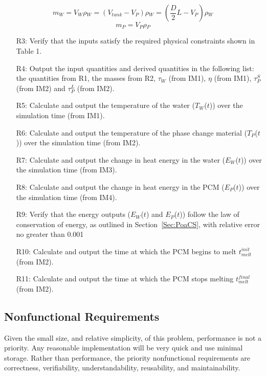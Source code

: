 \documentclass[12pt]{article}
\begin{document}
\begin{equation}
m_{W}=V_{W}\rho{}_{W}=(V_{tank}-V_{P})\rho{}_{W}=(\frac{D}{2}L-V_{P})\rho{}_{W}
\end{equation}
\begin{equation}
m_{P}=V_{P}\rho{}_{P}
\end{equation}
\begin{itemize}
\item[R3:]Verify that the inputs satisfy the required physical constraints shown in Table 1.
\item[R4:]Output the input quantities and derived quantities in the following list: the quantities from R1, the masses from R2, $\tau{}_{W}$ (from IM1), $\eta{}$ (from IM1), $\tau{}_{P}^{S}$ (from IM2) and $\tau{}_{P}^{L}$ (from IM2).
\item[R5:]Calculate and output the temperature of the water ($T_{W}$($t$)) over the simulation time (from IM1).
\item[R6:]Calculate and output the temperature of the phase change material ($T_{P}$($t$)) over the simulation time (from IM2).
\item[R7:]Calculate and  output the change in heat energy in the water ($E_{W}$($t$)) over the simulation time (from IM3).
\item[R8:]Calculate and output the change in heat energy in the PCM ($E_{P}$($t$)) over the simulation time (from IM4).
\item[R9:]Verify that the energy outputs ($E_{W}$($t$) and $E_{P}$($t$)) follow the law of conservation of energy, as outlined in Section~\ref{Sec:PoaCS}, with relative error no greater than 0.001%
\item[R10:]Calculate and output the time at which the PCM begins to melt $t_{melt}^{init}$ (from IM2).
\item[R11:]Calculate and output the time at which the PCM stops melting $t_{melt}^{final}$ (from IM2).
\end{itemize}
\subsection{Nonfunctional Requirements}
\label{Sec:NRs}
Given the small size, and relative simplicity, of this problem, performance is not a priority. Any reasonable implementation will be very quick and use minimal storage. Rather than performance, the priority nonfunctional requirements are correctness, verifiability, understandability, reusability, and maintainability.
\end{document}
